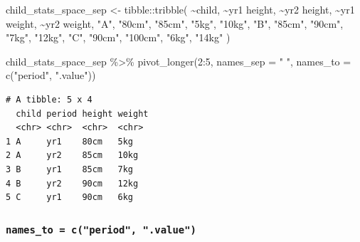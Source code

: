 \documentclass[
  letterpaper,
  DIV=11,
  numbers=noendperiod]{scrreprt}
\newenvironment{Shaded}{\begin{snugshade}}{\end{snugshade}}
\newcommand{\AttributeTok}[1]{\textcolor[rgb]{0.40,0.45,0.13}{#1}}
\newcommand{\DecValTok}[1]{\textcolor[rgb]{0.68,0.00,0.00}{#1}}
\newcommand{\FunctionTok}[1]{\textcolor[rgb]{0.28,0.35,0.67}{#1}}
\newcommand{\NormalTok}[1]{\textcolor[rgb]{0.00,0.23,0.31}{#1}}
\newcommand{\OtherTok}[1]{\textcolor[rgb]{0.00,0.23,0.31}{#1}}
\newcommand{\SpecialCharTok}[1]{\textcolor[rgb]{0.37,0.37,0.37}{#1}}
\newcommand{\StringTok}[1]{\textcolor[rgb]{0.13,0.47,0.30}{#1}}
\begin{document}
\begin{Shaded}
\begin{Highlighting}[]
\NormalTok{child\_stats\_space\_sep }\OtherTok{\textless{}{-}} 
\NormalTok{  tibble}\SpecialCharTok{::}\FunctionTok{tribble}\NormalTok{(}
    \SpecialCharTok{\textasciitilde{}}\NormalTok{child, }\SpecialCharTok{\textasciitilde{}}\StringTok{\textasciigrave{}}\AttributeTok{yr1 height}\StringTok{\textasciigrave{}}\NormalTok{, }\SpecialCharTok{\textasciitilde{}}\StringTok{\textasciigrave{}}\AttributeTok{yr2 height}\StringTok{\textasciigrave{}}\NormalTok{, }\SpecialCharTok{\textasciitilde{}}\StringTok{\textasciigrave{}}\AttributeTok{yr1 weight}\StringTok{\textasciigrave{}}\NormalTok{, }\SpecialCharTok{\textasciitilde{}}\StringTok{\textasciigrave{}}\AttributeTok{yr2 weight}\StringTok{\textasciigrave{}}\NormalTok{,}
       \StringTok{"A"}\NormalTok{,        }\StringTok{"80cm"}\NormalTok{,        }\StringTok{"85cm"}\NormalTok{,         }\StringTok{"5kg"}\NormalTok{,        }\StringTok{"10kg"}\NormalTok{,}
       \StringTok{"B"}\NormalTok{,        }\StringTok{"85cm"}\NormalTok{,        }\StringTok{"90cm"}\NormalTok{,         }\StringTok{"7kg"}\NormalTok{,        }\StringTok{"12kg"}\NormalTok{,}
       \StringTok{"C"}\NormalTok{,        }\StringTok{"90cm"}\NormalTok{,       }\StringTok{"100cm"}\NormalTok{,         }\StringTok{"6kg"}\NormalTok{,        }\StringTok{"14kg"}
\NormalTok{    )}

\NormalTok{child\_stats\_space\_sep }\SpecialCharTok{\%\textgreater{}\%} 
  \FunctionTok{pivot\_longer}\NormalTok{(}\DecValTok{2}\SpecialCharTok{:}\DecValTok{5}\NormalTok{, }
               \AttributeTok{names\_sep =} \StringTok{" "}\NormalTok{, }
               \AttributeTok{names\_to =} \FunctionTok{c}\NormalTok{(}\StringTok{"period"}\NormalTok{, }\StringTok{".value"}\NormalTok{))}
\end{Highlighting}
\end{Shaded}

\begin{verbatim}
# A tibble: 5 x 4
  child period height weight
  <chr> <chr>  <chr>  <chr> 
1 A     yr1    80cm   5kg   
2 A     yr2    85cm   10kg  
3 B     yr1    85cm   7kg   
4 B     yr2    90cm   12kg  
5 C     yr1    90cm   6kg   
\end{verbatim}

\subsubsection{\texorpdfstring{\texttt{names\_to\ =\ c("period",\ ".value")}}{names\_to = c("period", ".value")}}\label{names_to-cperiod-.value}
\end{document}
